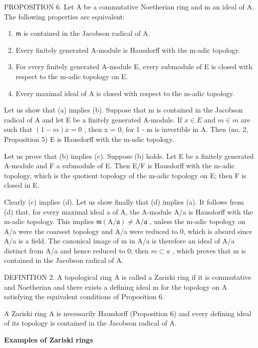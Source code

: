 PROPOSITION 6. Let A be a commutative Noetherian ring and m an ideal of A. The following properties are equivalent:

\begin{enumerate}
\def\labelenumi{(\alph{enumi})}
\item
  \(\mathfrak{m}\) is contained in the Jacobson radical of A.
\item
  Every finitely generated A-module is Hausdorff with the m-adic topology.
\item
  For every finitely generated A-module E, every submodule of E is closed with respect to the m-adic topology on E.
\item
  Every maximal ideal of A is closed with respect to the m-adic topology.
\end{enumerate}

Let us show that (a) implies (b). Suppose that m is contained in the Jacobson radical of A and let E be a finitely generated A-module. If \(x \in E\) and \(m \in m\) are such that \((1 - m)x = 0\) , then x = 0, for 1 - m is invertible in A. Then (no. 2, Proposition 5) E is Hausdorff with the m-adic topology.

Let us prove that (b) implies (c). Suppose (b) holds. Let E be a finitely generated A-module and F a submodule of E. Then E/F is Hausdorff with the m-adic topology, which is the quotient topology of the m-adic topology on E; then F is closed in E.

Clearly (c) implies (d). Let us show finally that (d) implies (a). It follows from (d) that, for every maximal ideal a of A, the A-module A/a is Hausdorff with the m-adic topology. This implies \(\mathfrak{m}(\mathrm{A}/\mathfrak{a}) \neq \mathrm{A}/\mathfrak{a}\) , unless the m-adic topology on A/a were the coarsest topology and A/a were reduced to 0, which is absurd since A/a is a field. The canonical image of m in A/a is therefore an ideal of A/a distinct from A/a and hence reduced to 0; then \(m \subset a\) , which proves that m is contained in the Jacobson radical of A.

DEFINITION 2. A topological ring A is called a Zariski ring if it is commutative and Noetherian and there exists a defining ideal m for the topology on A satisfying the equivalent conditions of Proposition 6.

A Zariski ring A is necessarily Hausdorff (Proposition 6) and every defining ideal of its topology is contained in the Jacobson radical of A.

\textbf{Examples of Zariski rings}\par

